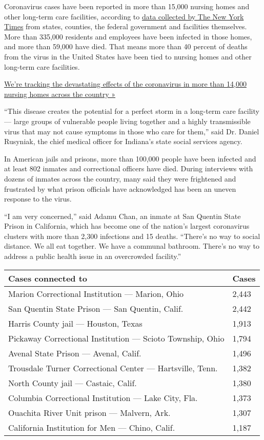 Coronavirus cases have been reported in more than 15,000 nursing homes
and other long-term care facilities, according to
\href{https://www.nytimes.com/interactive/2020/us/coronavirus-nursing-homes.html}{data
collected by The New York Times} from states, counties, the federal
government and facilities themselves. More than 335,000 residents and
employees have been infected in those homes, and more than 59,000 have
died. That means more than 40 percent of deaths from the virus in the
United States have been tied to nursing homes and other long-term care
facilities.

\href{https://www.nytimes.com/interactive/2020/us/coronavirus-nursing-homes.html}{We're
tracking the devastating effects of the coronavirus in more than 14,000
nursing homes across the country »}

``This disease creates the potential for a perfect storm in a long-term
care facility --- large groups of vulnerable people living together and
a highly transmissible virus that may not cause symptoms in those who
care for them,'' said Dr. Daniel Rusyniak, the chief medical officer for
Indiana's state social services agency.

In American jails and prisons, more than 100,000 people have been
infected and at least 802 inmates and correctional officers have died.
During interviews with dozens of inmates across the country, many said
they were frightened and frustrated by what prison officials have
acknowledged has been an uneven response to the virus.

``I am very concerned,'' said Adamu Chan, an inmate at San Quentin State
Prison in California, which has become one of the nation's largest
coronavirus clusters with more than 2,300 infections and 15 deaths.
``There's no way to social distance. We all eat together. We have a
communal bathroom. There's no way to address a public health issue in an
overcrowded facility.''

\begin{longtable}[]{@{}ll@{}}
\toprule
Cases connected to & Cases\tabularnewline
\midrule
\endhead
Marion Correctional Institution --- Marion, Ohio & 2,443 \tabularnewline
San Quentin State Prison --- San Quentin, Calif. & 2,442 \tabularnewline
Harris County jail --- Houston, Texas & 1,913 \tabularnewline
Pickaway Correctional Institution --- Scioto Township, Ohio & 1,794
\tabularnewline
Avenal State Prison --- Avenal, Calif. & 1,496 \tabularnewline
Trousdale Turner Correctional Center --- Hartsville, Tenn. & 1,382
\tabularnewline
North County jail --- Castaic, Calif. & 1,380 \tabularnewline
Columbia Correctional Institution --- Lake City, Fla. & 1,373
\tabularnewline
Ouachita River Unit prison --- Malvern, Ark. & 1,307 \tabularnewline
California Institution for Men --- Chino, Calif. & 1,187 \tabularnewline
\bottomrule
\end{longtable}


